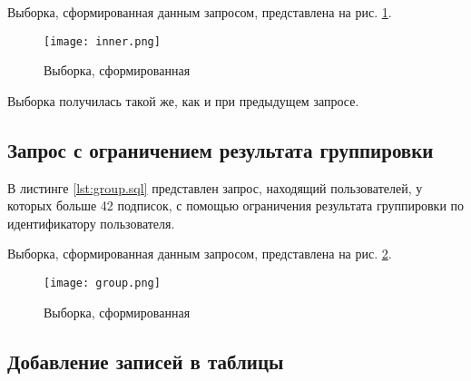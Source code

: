 Выборка, сформированная данным запросом, представлена на рис. \ref{fig:inner}.

\begin{figure}[H]
	\centering
	\texttt{[image: inner.png]}
	\caption{Выборка, сформированная }
	\label{fig:inner}
\end{figure}

Выборка получилась такой же, как и при предыдущем запросе.

\subsection{Запрос с ограничением результата группировки}

В листинге \ref{lst:group.sql} представлен запрос, находящий пользователей, у которых больше 42 подписок, с помощью ограничения результата группировки по идентификатору пользователя.



Выборка, сформированная данным запросом, представлена на рис. \ref{fig:group}.

\begin{figure}[H]
	\centering
	\texttt{[image: group.png]}
	\caption{Выборка, сформированная }
	\label{fig:group}
\end{figure}

\subsection{Добавление записей в таблицы}


